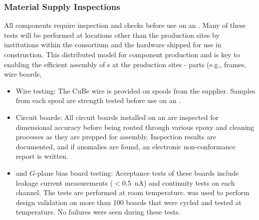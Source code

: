 \subsubsection{Material Supply Inspections}


All components require inspection and  checks before use on an .  Many of these tests will be performed at locations other than the  production sites by institutions within the consortium and the hardware shipped for use in  construction. This distributed model for component production and  is key to enabling the efficient assembly of s at the production sites - parts (e.g., frames, wire boards,       

\begin{itemize}

\item Wire testing: The CuBe wire is provided on spools from the supplier. Samples from each spool are strength tested before use on an .

\item Circuit boards: All circuit boards installed on an  are inspected for dimensional accuracy before being routed through various epoxy and cleaning processes as they are prepped for assembly. Inspection results are documented, and if anomalies are found, an electronic non-conformance report is written.  %

\item {} and $G$-plane bias board testing: Acceptance tests of these boards include leakage current measurements ($<$\SI{0.5}{nA}) and continuity tests on each channel.  The tests are performed at room temperature.  was used to perform design validation on more than \num{100} boards that were cycled and tested at \lntwo temperature. No failures were seen during these tests. 
\end{itemize}


